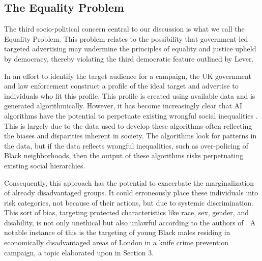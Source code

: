 \documentclass[preprint]{acmart}
\begin{document}


\subsection{The Equality Problem}

The third socio-political concern central to our discussion is what we call the Equality Problem. This problem relates to the possibility that government-led targeted advertising may undermine the principles of equality and justice upheld by democracy, thereby violating the third democratic feature outlined by Lever.

In an effort to identify the target audience for a campaign, the UK government and law enforcement construct a profile of the ideal target and advertise to individuals who fit this profile. This profile is created using available data and is generated algorithmically. However, it has become increasingly clear that AI algorithms have the potential to perpetuate existing wrongful social inequalities \cite{buolamwini2018gender,eubanks2018automating,obermeyer2019dissecting}. This is largely due to the data used to develop these algorithms often reflecting the biases and disparities inherent in society. The algorithms look for patterns in the data, but if the data reflects wrongful inequalities, such as over-policing of Black neighborhoods, then the output of these algorithms risks perpetuating existing social hierarchies.


Consequently, this approach has the potential to exacerbate the marginalization of already disadvantaged groups. It could erroneously place these individuals into risk categories, not because of their actions, but due to systemic discrimination. This sort of bias, targeting protected characteristics like race, sex, gender, and disability, is not only unethical but also unlawful according to the authors of \textit{\citeauthor{equalityact}}. A notable instance of this is the targeting of young Black males residing in economically disadvantaged areas of London in a knife crime prevention campaign, a topic elaborated upon in Section 3.
\end{document}
